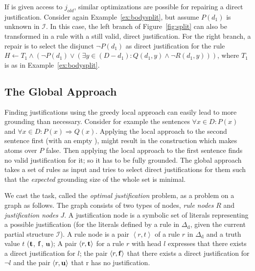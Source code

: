 \documentclass[11pt]{article}
\newcommand{\m}[1]{\ensuremath{#1}\xspace}
\newcommand{\trval}[1]{\m{{\bf #1}}}
\newcommand{\limplies}{\m{\Rightarrow}}
\newcommand{\lrule}{\m{\leftarrow}}
\newcommand{\ltrue}{\trval{t}}
\newcommand{\lfalse}{\trval{f}}
\newcommand{\lunkn}{\trval{u}}
\newcommand{\I}{\m{\mathcal{I}}}
\newcommand{\D}{\m{\Delta}}
\newcommand{\typed}[2]{\m{#1\in #2:}}
\newcommand{\tuple}[1]{\m{\left \langle #1 \right \rangle }}
\theoremstyle{plain}
\theoremstyle{definition}
\theoremstyle{example_basic}
\theoremstyle{example_contd}
\theoremstyle{plain}
\newcommand{\Dd}{\ensuremath{\D_\text{d}}\xspace}
\newcommand{\change}[1]{#1}
\begin{document}
If \buildconstr is given access to $j_{old}$, similar optimizations are possible for repairing a direct justification. Consider again Example~\ref{ex:bodysplit}, but assume  $P(d_1)$ is unknown in \I. In this case, the left branch of Figure~\ref{fig:split} can also be transformed in a rule with a still valid, direct justification. For the right branch, a repair is to select the disjunct $\lnot P(d_1)$ as direct justification for the rule
$H \lrule {T_1 \land  (\lnot P(d_1) \lor (\exists \typed{y}{(D - d_1)} Q(d_1,y) \land \lnot R(d_1,y)))}$, where $T_1$ is as in Example~\ref{ex:bodysplit}.


\subsection{The Global Approach}\label{ssec:global}
Finding justifications using the greedy local approach can easily lead to more grounding than necessary. Consider for example the sentences $\forall \typed{x}{D} P(x)$ and $\forall \typed{x}{D} P(x) \limplies Q(x)$. Applying the local approach to the second sentence first (with an empty \jgraph), might result in the construction which makes atoms over $P$ false. 
Then applying the local approach to the first sentence finds no
valid justification for it; so it has to be fully grounded.
The global approach takes a set of rules as input and tries to select direct justifications for them such that the \emph{expected} grounding size of the whole set is minimal.

\change{We cast the task, called the \emph{optimal justification}
  problem, as a problem on a graph as follows. The graph consists of
  two types of nodes, \emph{rule nodes} $R$ and \emph{justification
    nodes} $J$. A justification node is a symbolic set of literals
  representing a possible justification (for the literals defined by a
  rule in \Dd, given the current partial structure \I). A rule node
  is a pair $\tuple{r,t}$ of a rule $r$ in \Dd and a truth value $t$
  (\ltrue, \lfalse, \lunkn); A pair $\tuple{r,\ltrue}$ for a rule $r$
  with head $l$ expresses that there exists a direct justification for
  $l$; the pair $\tuple{r,\lfalse}$ that there exists a direct
  justification for $\lnot l$ and the pair $\tuple{r,\lunkn}$ that
  r has no justification.}
\end{document}
